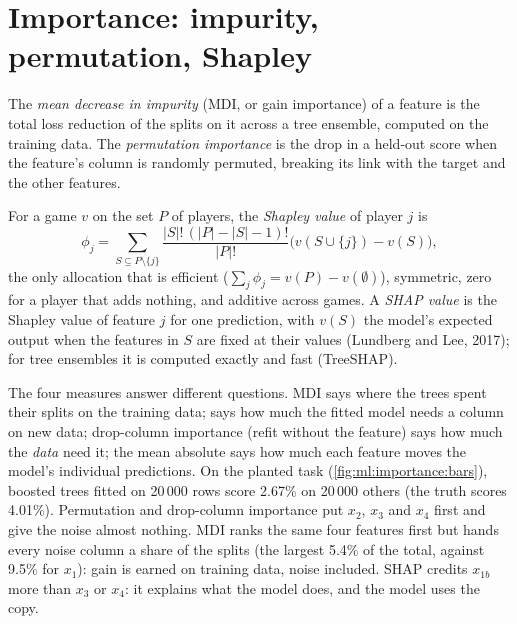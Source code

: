 \section{Importance: impurity, permutation, Shapley}

\begin{definition}\label{def:ml:feature-engineering-selection-and-importance:mdi}
The \emph{mean decrease in impurity} (MDI, or gain importance) of a feature is the
total loss reduction of the splits on it across a tree ensemble, computed on the training data. The \emph{permutation
importance} is the drop in a held-out score when the feature's column is randomly
permuted, breaking its link with the target and the other features.
\end{definition}

\begin{definition}\label{def:ml:feature-engineering-selection-and-importance:shapley}
For a game $v$ on the set $P$ of players, the \emph{Shapley value} of player $j$ is
\[
\phi_j = \sum_{S\subseteq P\setminus\{j\}}\frac{|S|!\,(|P| - |S| - 1)!}{|P|!}\bigl(v(S\cup\{j\}) - v(S)\bigr),
\]
the only allocation that is efficient ($\sum_j\phi_j = v(P) - v(\emptyset)$), symmetric, zero for a player that adds
nothing, and additive across games. A \emph{SHAP value} is the Shapley value of feature $j$ for one
prediction, with $v(S)$ the model's expected output when the features in $S$ are fixed at their values (Lundberg and Lee,
2017); for tree ensembles it is computed exactly and fast (TreeSHAP).
\end{definition}

The four measures answer different questions. MDI says where the trees spent their splits on the training data;
 says how much the fitted model needs a column on new data; drop-column importance (refit
without the feature) says how much the \emph{data} need it; the mean absolute  says how much each feature moves
the model's individual predictions. On the planted task (\cref{fig:ml:importance:bars}), boosted trees fitted on 20\,000
rows score 2.67\% on 20\,000 others (the truth scores 4.01\%). Permutation and drop-column importance put $x_2$, $x_3$ and
$x_4$ first and give the noise almost nothing. MDI ranks the same four features first but hands every noise column a
share of the splits (the largest 5.4\% of the total, against 9.5\% for $x_1$): gain is earned on training data, noise
included. SHAP credits $x_{1b}$ more than $x_3$ or $x_4$: it explains what the model does, and the model uses the copy.

